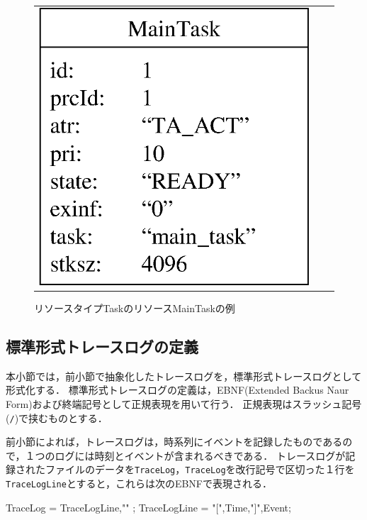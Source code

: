 \begin{figure}[p]
\begin{tabular}{ccc}
\begin{minipage}{0.3\hsize}
\begin{center}
\includegraphics[scale=0.5]{img/resourceSampleByTask.eps}
\caption{リソースタイプTaskのリソースMainTaskの例}
\label{fig:resourceSampleByTask}
\end{center}
\end{minipage}
\end{tabular}
\end{figure}

\clearpage

\subsection{標準形式トレースログの定義}

本小節では，前小節で抽象化したトレースログを，標準形式トレースログとして形式化する．
標準形式トレースログの定義は，EBNF(Extended Backus Naur Form)および終端記号として正規表現を用いて行う．
正規表現はスラッシュ記号({\tt /})で挟むものとする．

前小節によれば，トレースログは，時系列にイベントを記録したものであるので，１つのログには時刻とイベントが含まれるべきである．
トレースログが記録されたファイルのデータを\verb|TraceLog|，\verb|TraceLog|を改行記号で区切った１行を\verb|TraceLogLine|とすると，これらは次のEBNFで表現される．

\begin{EBNF}
TraceLog = { TraceLogLine,"\n" };
TraceLogLine = "[",Time,"]",Event;
\end{EBNF}


